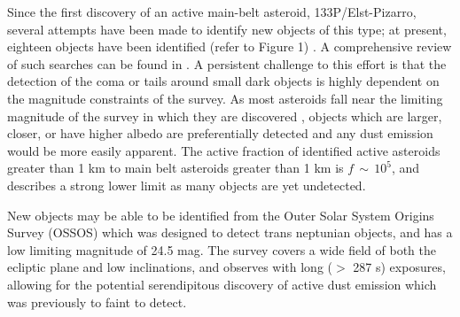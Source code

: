 \documentclass[iop,apj]{emulateapj}
\begin{document}



Since the first discovery of an active main-belt asteroid, 133P/Elst-Pizarro, several attempts have been made to identify new objects of this type; at present, eighteen objects have been identified (refer to Figure 1) \citep{jewitt15}. A comprehensive review of such searches can be found in \citet{hsieh15}.  A persistent challenge to this effort is that the detection of the coma or tails around small dark objects is highly dependent on the magnitude constraints of the survey. As most asteroids fall near the limiting magnitude of the survey in which they are discovered \citep{jewitt15}%
, objects which are larger, closer, or have higher albedo are preferentially detected and any dust emission would be more easily apparent. The active fraction of identified active asteroids greater than 1 km to main belt asteroids greater than 1 km is $f \, \sim \, 10^5$, and describes a strong lower limit as many objects are yet undetected. \citep{jewitt15} %


New objects may be able to be identified from the Outer Solar System Origins Survey (OSSOS) which was designed to detect trans neptunian objects, and has a low limiting magnitude of 24.5 mag. The survey covers a wide field of both the ecliptic plane and low inclinations, and observes with long ($>$ 287 s) exposures, allowing for the potential serendipitous discovery of active dust emission which was previously to faint to detect.
\end{document}
